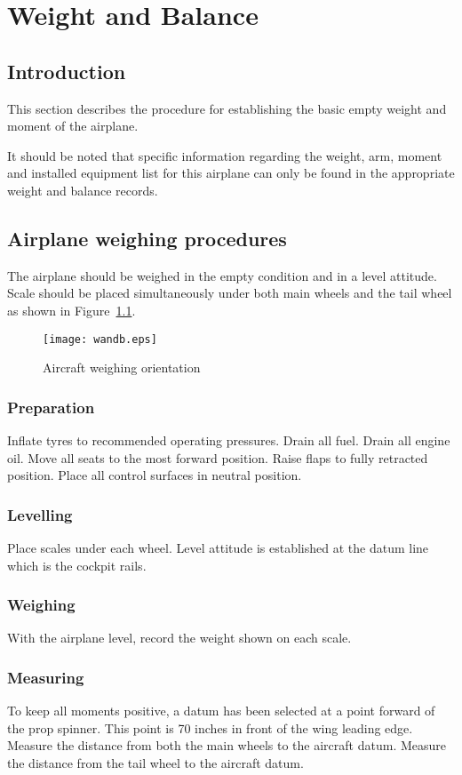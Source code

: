 \chapter{Weight and Balance}
\thispagestyle{fancy}
\minitoc[n] %

\section{Introduction}
This section describes the procedure for establishing the basic empty weight and moment of the airplane.  

It should be noted that specific information regarding the weight, arm, moment and installed equipment list for this airplane can only be found in the appropriate weight and balance records.

\section{Airplane weighing procedures}
The airplane should be weighed in the empty condition and in a level attitude.  Scale should be placed simultaneously under both main wheels and the tail wheel as shown in Figure~\ref{fig:wandb}.
\begin{figure}[h]
\centering
\texttt{[image: wandb.eps]}
\caption{Aircraft weighing orientation}
\label{fig:wandb}
\end{figure}

\subsection{Preparation}
Inflate tyres to recommended operating pressures.  Drain all fuel.  Drain all engine oil.  Move all seats to the most forward position.  Raise flaps to fully retracted position.  Place all control surfaces in neutral position.  
\subsection{Levelling}
Place scales under each wheel.  Level attitude is established at the datum line which is the cockpit rails.  
\subsection{Weighing}
With the airplane level, record the weight shown on each scale.  
\subsection{Measuring}
To keep all moments positive, a datum has been selected at a point forward of the prop spinner.  This point is 70 inches in front of the wing leading edge.  Measure the distance from both the main wheels to the aircraft datum.  Measure the distance from the tail wheel to the aircraft datum.
